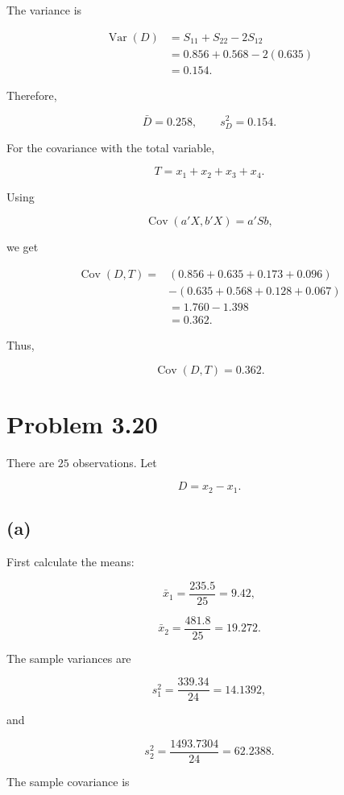 \documentclass[12pt]{article}
\begin{document}
The variance is

$$
\begin{aligned}
\operatorname{Var}(D)
&=S_{11}+S_{22}-2S_{12}\\
&=0.856+0.568-2(0.635)\\
&=\boxed{0.154}.
\end{aligned}
$$

Therefore,

$$
\boxed{\bar{D}=0.258,\qquad s_D^2=0.154}.
$$

For the covariance with the total variable,

$$
T=x_1+x_2+x_3+x_4.
$$

Using

$$
\operatorname{Cov}(a'X,b'X)=a'Sb,
$$

we get

$$
\begin{aligned}
\operatorname{Cov}(D,T)
={}&(0.856+0.635+0.173+0.096)\\
&-(0.635+0.568+0.128+0.067)\\
&=1.760-1.398\\
&=\boxed{0.362}.
\end{aligned}
$$

Thus,

$$
\boxed{\operatorname{Cov}(D,T)=0.362}.
$$

\newpage

\section*{Problem 3.20}

There are $25$ observations. Let

$$
D=x_2-x_1.
$$

\subsection*{(a)}

First calculate the means:

$$
\bar{x}_1
=
\frac{235.5}{25}
=
\boxed{9.42},
$$

$$
\bar{x}_2
=
\frac{481.8}{25}
=
\boxed{19.272}.
$$

The sample variances are

$$
s_1^2
=
\frac{339.34}{24}
=
\boxed{14.1392},
$$

and

$$
s_2^2
=
\frac{1493.7304}{24}
=
\boxed{62.2388}.
$$

The sample covariance is
\end{document}

